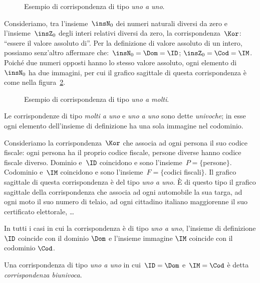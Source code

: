 \begin{exrig}
\begin{figure}[ht]
 \centering
 \caption{Esempio di corrispondenza di tipo \emph{uno a uno}.}\label{fig:C.6}
\end{figure}
\begin{esempio}
Consideriamo, tra l'insieme~$\insN_0$ dei numeri naturali diversi da zero e l'insieme~$\insZ_0$ degli interi relativi diversi da zero, la corrispondenza~$\Kor$: ``essere il valore assoluto di''.
Per la definizione di valore assoluto di un intero, possiamo senz'altro affermare che:~$\insN_0=\Dom=\ID$; $\insZ_0=\Cod=\IM$. Poiché due numeri opposti hanno lo stesso valore assoluto,
ogni elemento di~$\insN_0$ ha due immagini, per cui il grafico sagittale di questa corrispondenza è come nella figura~\ref{fig:C.7}.
\end{esempio}
\begin{figure}[ht]
 \centering
 \caption{Esempio di corrispondenza di tipo \emph{uno a molti}.}\label{fig:C.7}
\end{figure}
\end{exrig}

\begin{definizione}
Le corrispondenze di tipo \emph{molti a uno} e \emph{uno a uno} sono dette \emph{univoche}; in esse ogni elemento dell'insieme di definizione ha una sola immagine nel codominio.
\end{definizione}
\pagebreak
\begin{exrig}
\begin{esempio}
Consideriamo la corrispondenza~$\Kor$ che associa ad ogni persona il suo codice fiscale: ogni persona ha il proprio codice fiscale, persone diverse hanno codice fiscale diverso.
Dominio e~$\ID$ coincidono e sono l'insieme~$P= \{$persone$\}$. Codominio e~$\IM$ coincidono e sono l'insieme~$F= \{$codici fiscali$\}.$ Il grafico sagittale di questa corrispondenza
è del tipo \emph{uno a uno}. È di questo tipo il grafico sagittale della corrispondenza che associa ad ogni automobile la sua targa, ad ogni moto il suo numero di telaio,
ad ogni cittadino italiano maggiorenne il suo certificato elettorale, \ldots

\end{esempio}
\end{exrig}

\osservazione In tutti i casi in cui la corrispondenza è di tipo \emph{uno a uno}, l'insieme di definizione $\ID$ coincide con il dominio $\Dom$ e l'insieme immagine $\IM$ coincide con il codominio $\Cod$.

\begin{definizione}
Una corrispondenza di tipo \emph{uno a uno} in cui~$\ID=\Dom$ e~$\IM=\Cod$ è detta \emph{corrispondenza biunivoca}.
\end{definizione}

\ovalbox{\risolvii \ref{ese:C.4}, \ref{ese:C.5}, \ref{ese:C.6}, \ref{ese:C.7}, \ref{ese:C.8}, \ref{ese:C.9}, \ref{ese:C.10}}
\newpage

\cleardoublepage
